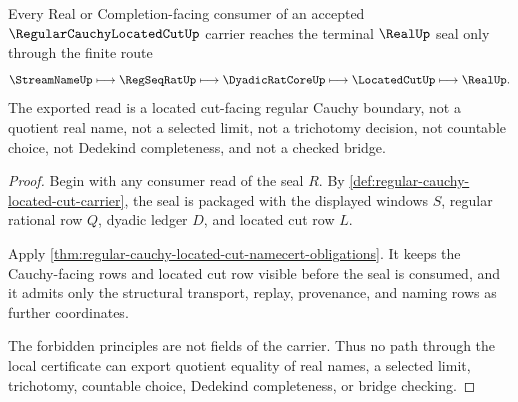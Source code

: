 \begin{theorem}
\label{thm:regular-cauchy-located-cut-realseal-handoff}
Every Real or Completion-facing consumer of an accepted $\RegularCauchyLocatedCutUp$ carrier reaches the terminal $\RealUp$ seal only through the finite route
$$
\StreamNameUp \longmapsto \RegSeqRatUp \longmapsto \DyadicRatCoreUp \longmapsto \LocatedCutUp \longmapsto \RealUp .
$$
The exported read is a located cut-facing regular Cauchy boundary, not a quotient real name, not a selected limit, not a trichotomy decision, not countable choice, not Dedekind completeness, and not a checked bridge.
\end{theorem}
\begin{proof}
Begin with any consumer read of the seal $R$. By \autoref{def:regular-cauchy-located-cut-carrier}, the seal is packaged with the displayed windows $S$, regular rational row $Q$, dyadic ledger $D$, and located cut row $L$.

Apply \autoref{thm:regular-cauchy-located-cut-namecert-obligations}. It keeps the Cauchy-facing rows and located cut row visible before the seal is consumed, and it admits only the structural transport, replay, provenance, and naming rows as further coordinates.

The forbidden principles are not fields of the carrier. Thus no path through the local certificate can export quotient equality of real names, a selected limit, trichotomy, countable choice, Dedekind completeness, or bridge checking.
\end{proof}


\begin{closurestatus}{\RegularCauchyLocatedCutUp}
  \theoryclosure{\seedClosure}
  \formalstatus{\unformalizedV}
\end{closurestatus}
